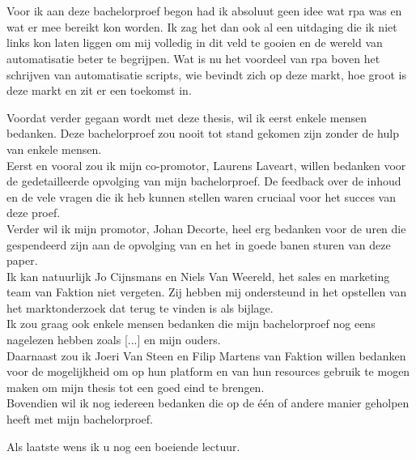 
\chapter*{}
\label{ch:voorwoord}

Voor ik aan deze bachelorproef begon had ik absoluut geen idee wat \acrlong{rpa} was en wat er mee bereikt kon worden. Ik zag het dan ook al een uitdaging die ik niet links kon laten liggen om mij volledig in dit veld te gooien en de wereld van automatisatie beter te begrijpen. Wat is nu het voordeel van \acrshort{rpa} boven het schrijven van automatisatie scripts, wie bevindt zich op deze markt, hoe groot is deze markt en zit er een toekomst in.

Voordat verder gegaan wordt met deze thesis, wil ik eerst enkele mensen bedanken. Deze bachelorproef zou nooit tot stand gekomen zijn zonder de hulp van enkele mensen.\\
Eerst en vooral zou ik mijn co-promotor, Laurens Laveart, willen bedanken voor de gedetailleerde
opvolging van mijn bachelorproef. De feedback over de inhoud en de vele vragen die ik heb kunnen stellen waren cruciaal voor het succes van deze proef.\\
Verder wil ik mijn promotor, Johan Decorte, heel erg bedanken voor de uren die
gespendeerd zijn aan de opvolging van en het in goede banen sturen van deze paper.\\
Ik kan natuurlijk Jo Cijnsmans en Niels Van Weereld, het sales en marketing team van Faktion niet vergeten. Zij hebben mij ondersteund in het opstellen van het marktonderzoek dat terug te vinden is als bijlage.\\
Ik zou graag ook enkele mensen bedanken die mijn bachelorproef nog eens nagelezen hebben zoals [...] en mijn ouders.\\
Daarnaast zou ik Joeri Van Steen en Filip Martens van Faktion willen bedanken voor de mogelijkheid om op hun platform en van hun resources gebruik te mogen maken om mijn thesis tot een goed eind te brengen. \\
Bovendien wil ik nog iedereen bedanken die op de één of andere manier geholpen heeft met mijn bachelorproef.

Als laatste wens ik u nog een boeiende lectuur.


